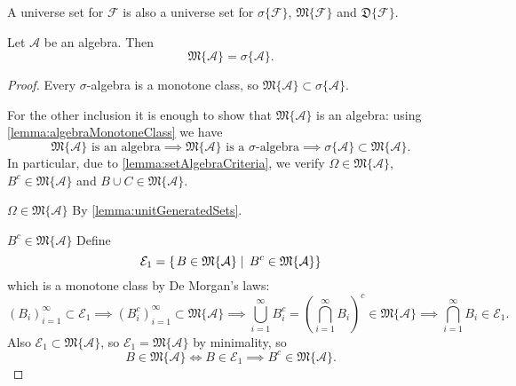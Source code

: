 \begin{lemma} \label{lemma:unitGeneratedSets}
A universe set for $\mathcal{F}$ is also a universe set for $\sigma\{\mathcal{F}\}$, $\mathfrak{M}\{\mathcal{F}\}$ and $\mathfrak{D}\{\mathcal{F}\}$.
\end{lemma}

\begin{proposition}
Let $\mathcal{A}$ be an algebra. Then
\[ \mathfrak{M}\{\mathcal{A}\} = \sigma\{\mathcal{A}\}. \]
\end{proposition}
\begin{proof}
Every $\sigma$-algebra is a monotone class, so $\mathfrak{M}\{\mathcal{A}\} \subset \sigma\{\mathcal{A}\}$.

For the other inclusion it is enough to show that $\mathfrak{M}\{\mathcal{A}\}$ is an algebra: using \ref{lemma:algebraMonotoneClass} we have
\[ \text{$\mathfrak{M}\{\mathcal{A}\}$ is an algebra} \implies \text{$\mathfrak{M}\{\mathcal{A}\}$ is a $\sigma$-algebra} \implies \sigma\{\mathcal{A}\}\subset\mathfrak{M}\{\mathcal{A}\}. \]
In particular, due to \ref{lemma:setAlgebraCriteria}, we verify $\Omega\in \mathfrak{M}\{\mathcal{A}\}$, $B^c \in \mathfrak{M}\{\mathcal{A}\}$ and $B\cup C \in \mathfrak{M}\{\mathcal{A}\}$.

$\boxed{\Omega\in \mathfrak{M}\{\mathcal{A}\}}$ By \ref{lemma:unitGeneratedSets}.

$\boxed{B^c \in \mathfrak{M}\{\mathcal{A}\}}$ Define
\[ \mathcal{E}_1 = \left\{\left. B\in\mathfrak{M}\{\mathcal{A}\} \;\right|\; B^c\in\mathfrak{M}\{\mathcal{A}\} \right\} \]
which is a monotone class by De Morgan's laws:
\[ (B_i)_{i=1}^\infty\subset \mathcal{E}_1 \implies (B_i^c)_{i=1}^\infty\subset \mathfrak{M}\{\mathcal{A}\} \implies \bigcup_{i=1}^\infty B_i^c = \left(\bigcap_{i=1}^\infty B_i\right)^c \in\mathfrak{M}\{\mathcal{A}\} \implies \bigcap_{i=1}^\infty B_i \in \mathcal{E}_1. \]
Also $\mathcal{E}_1\subset \mathfrak{M}\{\mathcal{A}\}$, so $\mathcal{E}_1 = \mathfrak{M}\{\mathcal{A}\}$ by minimality, so
\[ B\in\mathfrak{M}\{\mathcal{A}\} \iff B\in\mathcal{E}_1 \implies B^c\in\mathfrak{M}\{\mathcal{A}\}. \]


\end{proof}
